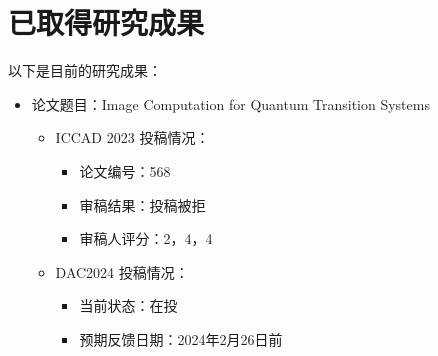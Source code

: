 \section{已取得研究成果}
以下是目前的研究成果：
\begin{itemize}
    \item 论文题目：Image Computation for Quantum Transition Systems
    \begin{itemize}
        \item ICCAD 2023 投稿情况：
        \begin{itemize}
            \item 论文编号：568
            \item 审稿结果：投稿被拒
            \item 审稿人评分：2，4，4
        \end{itemize}
        \item DAC2024 投稿情况：
        \begin{itemize}
            \item 当前状态：在投
            \item 预期反馈日期：2024年2月26日前
        \end{itemize}
    \end{itemize}
\end{itemize}